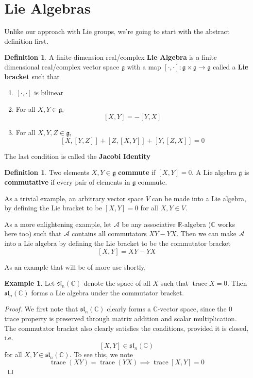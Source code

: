 \documentclass[psamsfonts]{amsart}
\theoremstyle{definition}
\newtheorem{defn}[thm]{Definition}
\newtheorem{exmp}[thm]{Example}
\theoremstyle{remark}
\newcommand{\R}{\mathbb{R}}
\newcommand{\C}{\mathbb{C}}
\newcommand{\bra}[2]{ \left[ #1, #2 \right] }
\DeclareMathOperator{\trace}{trace}
\begin{document}
\section{Lie Algebras}

Unlike our approach with Lie groups, we're going to start with the abstract definition first.

\begin{defn}
A finite-dimension real/complex \textbf{Lie Algebra} is a finite dimensional real/complex vector space $\mathfrak{g}$ with a map $[\cdot,\cdot]: \mathfrak{g} \times \mathfrak{g} \to \mathfrak{g}$ called a \textbf{Lie bracket} such that 
\begin{enumerate}
\item $\bra{\cdot}{\cdot}$ is bilinear
\item For all $X,Y \in \mathfrak{g}$, 
$$\bra{X}{Y} = -\bra{Y}{X} $$
\item For all $X,Y,Z \in \mathfrak{g}$,
$$\bra{X}{\bra{Y}{Z}} + \bra{Z}{\bra{X}{Y}} + \bra{Y}{\bra{Z}{X}} = 0 $$
\end{enumerate}
The last condition is called the \textbf{Jacobi Identity}
\end{defn}

\begin{defn}
Two elements $X,Y \in \mathfrak{g}$ \textbf{commute} if $\bra{X}{Y} = 0$. A Lie algebra $\mathfrak{g}$ is \textbf{commutative} if every pair of elements in $\mathfrak{g}$ commute.
\end{defn}

As a trivial example, an arbitrary vector space $V$ can be made into a Lie algebra, by defining the Lie bracket to be $\bra{X}{Y} = 0$ for all $X,Y \in V$.

As a more enlightening example, let $\mathscr{A}$ be any associative $\R$-algebra ($\C$ works here too) such that $\mathscr{A}$ contains all commutators $XY - YX$. Then we can make $\mathscr{A}$ into a Lie algebra by defining the Lie bracket to be the commutator bracket
$$\bra{X}{Y} = XY - YX $$

As an example that will be of more use shortly,
\begin{exmp}
Let $\mathfrak{sl}_n(\C)$ denote the space of all $X$ such that $\trace{X} = 0$. Then $\mathfrak{sl}_n(\C)$ forms a Lie algebra under the commutator bracket.
\end{exmp}

\begin{proof}
We first note that $\mathfrak{sl}_n(\C)$ clearly forms a $\C$-vector space, since the $0$ trace property is preserved through matrix addition and scalar multiplication. The commutator bracket also clearly satisfies the conditions, provided it is closed, i.e. 
$$\bra{X}{Y} \in \mathfrak{sl}_n(\C) $$
for all $X,Y \in \mathfrak{sl}_n(\C)$. To see this, we note 
$$\trace(XY) = \trace(YX) \implies \trace\bra{X}{Y} = 0 $$
\end{proof}
\end{document}
